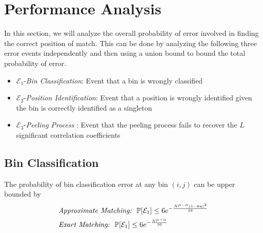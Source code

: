 \section{Performance Analysis}
\def\vgap{2pt}
In this section, we will analyze the overall probability of error involved in finding the correct position of match. This can be done by analyzing the following three error events independently and then using a union bound to bound the total probability of error.

\begin{itemize}
	\item $\mathcal{E}_1${-\it Bin Classification}: Event that a bin is wrongly classified
	\item $\mathcal{E}_2${-\it Position Identification}: Event that a position is wrongly identified given the bin is correctly identified as a singleton  
	\item $\mathcal{E}_3${-\it Peeling Process} : Event that the peeling process fails to recover the $L$ significant correlation coefficients
\end{itemize}

\subsection{\bf Bin Classification}
\begin{lemma}
The probability of bin classification error at any bin $(i,j)$ can be upper bounded by
\begin{align*}
&\textit{Approximate Matching:}~ ~ \mathbb{P}[\mathcal{E}_1]\leq 6e^{-\frac{N^{\mu-\alpha}(1-6\eta)^2}{16}} \\
  &\textit{Exact Matching:}~ ~ \mathbb{P}[\mathcal{E}_1]\leq 6e^{-\frac{N^{\mu-\alpha}}{16}}
\end{align*}
\end{lemma}


